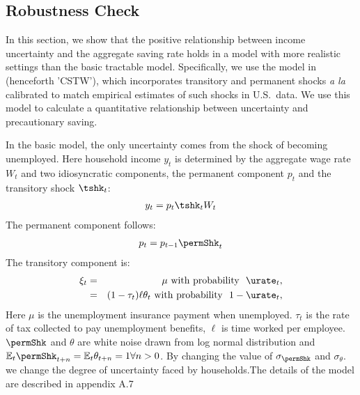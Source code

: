 \subsection{Robustness Check}

In this section, we show that the positive relationship between income uncertainty and the aggregate saving rate holds in a model with more realistic settings than the basic tractable model. Specifically, we use the model in \cite{cstwMPC} (henceforth 'CSTW'), which incorporates transitory and permanent shocks {\it a la} \cite{friedmanATheory} calibrated to match empirical estimates of such shocks in U.S.\ data.  We use this model to calculate a quantitative relationship between uncertainty and precautionary saving.

In the basic model, the only uncertainty comes from the shock of becoming unemployed. Here household income $y_{t}$ is determined by the aggregate wage rate $W_{t}$ and two idiosyncratic components, the permanent component $p_{t}$ and the transitory shock $\tshk_{t}$:
\begin{align}
y_{t}=p_{t}\tshk_{t}{W}_{t}
\end{align}
The permanent component follows:
\begin{align}
p_{t}=p_{t-1}\permShk_{t}
\end{align}
The transitory component is:
\begin{eqnarray}
  \xi_{t} & = & \mu \textrm{ with probability }\ \urate_{t}, \label{eq:tran}
\\ & = & (1-\tau_{t})\ell\theta_{t} \textrm{ with probability }\ 1-\urate_{t}, \nonumber
\end{eqnarray}
Here $\mu$ is the unemployment insurance payment when unemployed. $\tau_{t}$ is the rate of tax collected to pay unemployment benefits, $\ell$ is time worked per employee. $\permShk$ and $\theta$ are white noise drawn from log normal distribution and $\mathbb{E}_{t}\permShk_{t+n}=\mathbb{E}_{t}\theta_{t+n}=1\forall n>0$. By changing the value of $\sigma_{\permShk}$ and $\sigma_{\theta}$. we change the degree of uncertainty faced by households.The details of the model are described in appendix A.7

